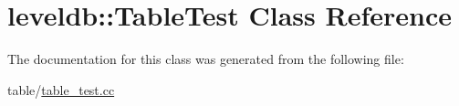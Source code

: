 \hypertarget{classleveldb_1_1_table_test}{\section{leveldb\-:\-:Table\-Test Class Reference}
\label{classleveldb_1_1_table_test}
}


The documentation for this class was generated from the following file\-:\begin{DoxyCompactItemize}
\item 
table/\hyperlink{table__test_8cc}{table\-\_\-test.\-cc}\end{DoxyCompactItemize}
